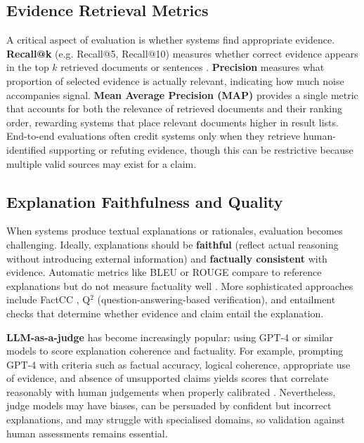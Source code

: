 \documentclass[12pt,a4paper]{article}
\begin{document}
\subsection{Evidence Retrieval Metrics}

A critical aspect of evaluation is whether systems find appropriate evidence. \textbf{Recall@k} (e.g. Recall@5, Recall@10) measures whether correct evidence appears in the top $k$ retrieved documents or sentences \citep{thorne2018fever}. \textbf{Precision} measures what proportion of selected evidence is actually relevant, indicating how much noise accompanies signal. \textbf{Mean Average Precision (MAP)} provides a single metric that accounts for both the relevance of retrieved documents and their ranking order, rewarding systems that place relevant documents higher in result lists. End-to-end evaluations often credit systems only when they retrieve human-identified supporting or refuting evidence, though this can be restrictive because multiple valid sources may exist for a claim.

\subsection{Explanation Faithfulness and Quality}

When systems produce textual explanations or rationales, evaluation becomes challenging. Ideally, explanations should be \textbf{faithful} (reflect actual reasoning without introducing external information) and \textbf{factually consistent} with evidence. Automatic metrics like BLEU or ROUGE compare to reference explanations but do not measure factuality well \citep{raschka2025llmeval}. More sophisticated approaches include FactCC \citep{skywork2024hallucinations}, Q$^2$ (question-answering-based verification), and entailment checks that determine whether evidence and claim entail the explanation.

\textbf{LLM-as-a-judge} has become increasingly popular: using GPT-4 or similar models to score explanation coherence and factuality. For example, prompting GPT-4 with criteria such as factual accuracy, logical coherence, appropriate use of evidence, and absence of unsupported claims yields scores that correlate reasonably with human judgements when properly calibrated \citep{raschka2025llmeval, ruder2025llmeval}. Nevertheless, judge models may have biases, can be persuaded by confident but incorrect explanations, and may struggle with specialised domains, so validation against human assessments remains essential.
\end{document}
